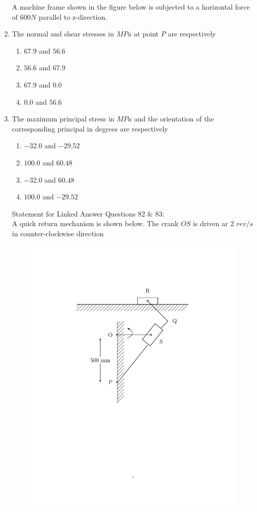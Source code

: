 \documentclass[journal,12pt,onecolumn,article]{IEEEtran}
\theoremstyle{remark}
\begin{document}
\begin{enumerate}
		A machine frame shown in the figure below is subjected to a horizontal force of $600 N$ parallel to z-direction.
	\item The normal and shear stresses in $MPa$ at point $P$ are respectively 
		\begin{enumerate}
			\item $67.9$ and $56.6$
			\item $56.6$ and $67.9$
			\item $67.9$ and $0.0$
			\item $0.0$ and $56.6$	
		\end{enumerate}
	\item The maximum principal stress in $MPa$ and the orientation of the corresponding principal in degrees are respectively 
		\begin{enumerate}
			\item $-32.0$ and $-29.52$
			\item $100.0$ and $60.48$
			\item $-32.0$ and $60.48$
			\item $100.0$ and $-29.52$
		\end{enumerate}
		Statement for Linked Answer Questions 82 \& 83: \\
		A quick return mechanism is shown below. The crank $OS$ is driven ar 2 $rev/s$ in counter-clockwise direction
			\begin{figure}[H]
	\centering
	\includegraphics[width=0.7\linewidth]{fig/fig82/main.pdf}
\end{figure}
\vspace{-70pt}


\end{enumerate}
\end{document}

